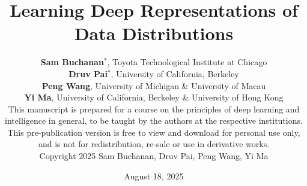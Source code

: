 \documentclass{book}
\begin{document}
\title{Learning Deep Representations of Data Distributions}

\author{\vspace{0.5cm}
\textbf{Sam Buchanan}$^*$, Toyota Technological Institute at Chicago \vspace{3mm}\\
    \textbf{Druv Pai}$^*$, University of California, Berkeley \vspace{3mm} \\
    \textbf{Peng Wang}, University of Michigan \& 
    University of Macau  \vspace{3mm} \\
    \textbf{Yi Ma},   University of California, Berkeley \& University of Hong Kong
	\vspace{8cm}\\
	\footnotesize
	This manuscript is prepared for a course on the principles of deep learning
  and intelligence in general, to be taught by the authors at the respective
  institutions. This pre-publication version is free to view and download for
  personal use only, and is not for redistribution, re-sale or use in derivative
  works.\\  Copyright  2025 Sam Buchanan, Druv Pai, Peng Wang, Yi
  Ma
}

\date{\large August 18, 2025}

\frontmatter
\titlepage
\thispagestyle{empty}
\maketitle

\cleardoublepage

% 

% 

% 


\cleardoublepage
\end{document}
